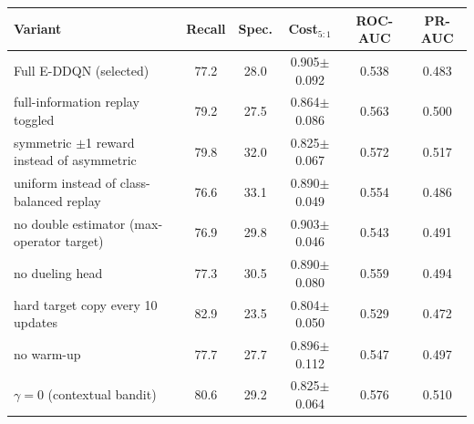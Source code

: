 \begin{tabular}{lccccc}
\toprule
Variant & Recall & Spec. & Cost$_{5:1}$ & ROC-AUC & PR-AUC \\
\midrule
Full E-DDQN (selected) & 77.2 & 28.0 & 0.905$\pm$0.092 & 0.538 & 0.483 \\
\midrule
full-information replay toggled & 79.2 & 27.5 & 0.864$\pm$0.086 & 0.563 & 0.500 \\
symmetric $\pm$1 reward instead of asymmetric & 79.8 & 32.0 & 0.825$\pm$0.067 & 0.572 & 0.517 \\
uniform instead of class-balanced replay & 76.6 & 33.1 & 0.890$\pm$0.049 & 0.554 & 0.486 \\
no double estimator (max-operator target) & 76.9 & 29.8 & 0.903$\pm$0.046 & 0.543 & 0.491 \\
no dueling head & 77.3 & 30.5 & 0.890$\pm$0.080 & 0.559 & 0.494 \\
hard target copy every 10 updates & 82.9 & 23.5 & 0.804$\pm$0.050 & 0.529 & 0.472 \\
no warm-up & 77.7 & 27.7 & 0.896$\pm$0.112 & 0.547 & 0.497 \\
$\gamma=0$ (contextual bandit) & 80.6 & 29.2 & 0.825$\pm$0.064 & 0.576 & 0.510 \\
\bottomrule
\end{tabular}
